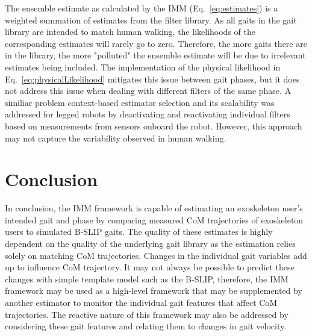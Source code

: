 The ensemble estimate as calculated by the IMM (Eq.~\ref{eq:estimates}) is a weighted summation of estimates from the filter library. As all gaits in the gait library are intended to match human walking, the likelihoods of the corresponding estimates will rarely go to zero. Therefore, the more gaits there are in the library, the more "polluted" the ensemble estimate will be due to irrelevant estimates being included. The implementation of the physical likelihood in Eq.~\ref{eq:physicalLikelihood} mitigates this issue between gait phases, but it does not address this issue when dealing with different filters of the same phase. A similiar problem context-based estimator selection and its scalability was addressed for legged robots by deactivating and reactivating individual filters \cite{skaff2010context} based on measurements from sensors onboard the robot. However, this approach may not capture the variability observed in human walking.

\section{Conclusion}
In conclusion, the IMM framework is capable of estimating an exoskeleton user's intended gait and phase by comparing measured CoM trajectories of exoskeleton users to simulated B-SLIP gaits. The  quality of these estimates is highly dependent on the quality of the underlying gait library as the estimation relies solely on matching CoM trajectories. Changes in the individual gait variables add up to influence CoM trajectory. It may not always be possible to predict these changes with simple template model such as the B-SLIP, therefore, the IMM framework may be used as a high-level framework that may be supplemented by another estimator to monitor the individual gait features that affect CoM trajectories. The reactive nature of this framework may also be addressed by considering these gait features and relating them to changes in gait velocity.